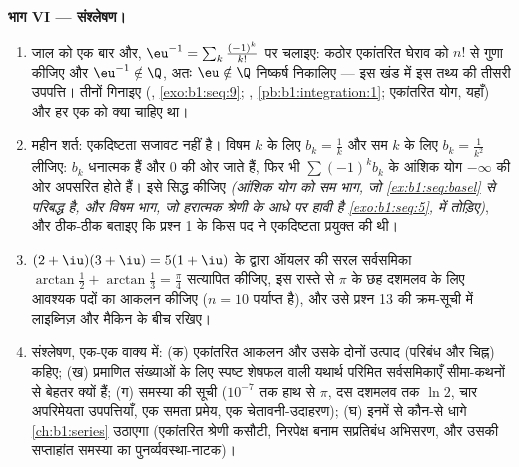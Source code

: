 \begin{problem}
\medskip \noindent\textbf{भाग VI --- संश्लेषण।}
\begin{enumerate}[resume]
  \item जाल को एक बार और, $\eu^{-1} = \sum_k \frac{(-1)^k}{k!}$ पर चलाइए:
  कठोर एकांतरित घेराव को $n!$ से गुणा कीजिए और $\eu^{-1} \notin \Q$, अतः
  $\eu \notin \Q$ निष्कर्ष निकालिए --- इस खंड में इस तथ्य की तीसरी उपपत्ति।
  तीनों गिनाइए (, \cref{exo:b1:seq:9}; ,
  \cref{pb:b1:integration:1}; एकांतरित योग, यहाँ) और हर एक को क्या चाहिए था।
  \item महीन शर्त: एकदिष्टता सजावट नहीं है। विषम $k$ के लिए $b_k = \frac1k$
  और सम $k$ के लिए $b_k = \frac{1}{k^2}$ लीजिए: $b_k$ धनात्मक हैं और $0$ की
  ओर जाते हैं, फिर भी $\sum (-1)^k b_k$ के आंशिक योग $-\infty$ की ओर अपसरित
  होते हैं। इसे सिद्ध कीजिए \emph{(आंशिक योग को सम भाग, जो
  \cref{ex:b1:seq:basel} से परिबद्ध है, और विषम भाग, जो हरात्मक श्रेणी के
  आधे पर हावी है \cref{exo:b1:seq:5}, में तोड़िए)}, और ठीक-ठीक बताइए कि
  प्रश्न 1 के किस पद ने एकदिष्टता प्रयुक्त की थी।
  \item $(2 + \iu)(3 + \iu) = 5(1 + \iu)$ के द्वारा ऑयलर की सरल सर्वसमिका
  $\arctan\frac12 + \arctan\frac13 = \frac\pi4$ सत्यापित कीजिए, इस रास्ते से
  $\pi$ के छह दशमलव के लिए आवश्यक पदों का आकलन कीजिए ($n = 10$ पर्याप्त है),
  और उसे प्रश्न 13 की क्रम-सूची में लाइब्निज़ और मैकिन के बीच रखिए।
  \item संश्लेषण, एक-एक वाक्य में: (क) एकांतरित आकलन और उसके दोनों उत्पाद
  (परिबंध और चिह्न) कहिए; (ख) प्रमाणित संख्याओं के लिए स्पष्ट शेषफल वाली
  यथार्थ परिमित सर्वसमिकाएँ सीमा-कथनों से बेहतर क्यों हैं; (ग) समस्या की
  सूची ($10^{-7}$ तक हाथ से $\pi$, दस दशमलव तक $\ln 2$, चार अपरिमेयता
  उपपत्तियाँ, एक समता प्रमेय, एक चेतावनी-उदाहरण); (घ) इनमें से कौन-से धागे
  \cref{ch:b1:series} उठाएगा (एकांतरित श्रेणी कसौटी, निरपेक्ष बनाम सप्रतिबंध
  अभिसरण, और उसकी सप्ताहांत समस्या का पुनर्व्यवस्था-नाटक)।
\end{enumerate}
\end{problem}
